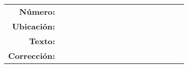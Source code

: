 \documentclass[landscape]{slides}
\begin{document}
\begin{tabular}{r|p{0.7 \linewidth}}
	\textbf{Número:} &  \\ 
	\textbf{Ubicación:} &  \\ 
	\textbf{Texto:} & 
	\\ 
	\textbf{Corrección:} & 
\end{itemize}
\end{tabular}
\end{document}
